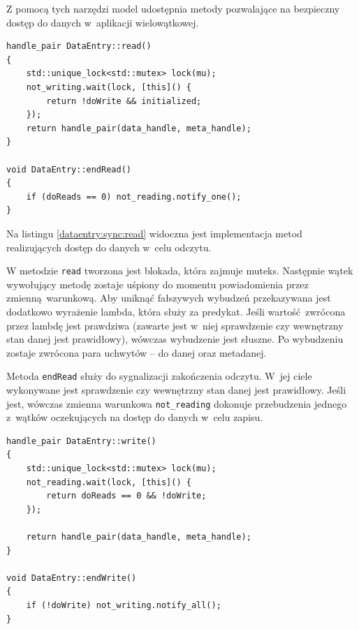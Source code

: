 Z pomocą tych narzędzi model udostępnia metody pozwalające na bezpieczny dostęp do danych w~aplikacji wielowątkowej.

\begin{minipage}{\textwidth}
	\begin{lstlisting}[label=dataentry:sync:read, caption={Metody klasy \lstinline$DataEntry$ zapewniające bezpieczny odczyt danych współdzielonych w~środowisku wielowątkowym},alsoletter={()[].=}]
handle_pair DataEntry::read()
{
	std::unique_lock<std::mutex> lock(mu);
	not_writing.wait(lock, [this]() {
		return !doWrite && initialized;
	});
	return handle_pair(data_handle, meta_handle);
}

void DataEntry::endRead()
{
	if (doReads == 0) not_reading.notify_one();
}
	\end{lstlisting}
\end{minipage}

Na listingu \ref{dataentry:sync:read} widoczna jest implementacja metod realizujących dostęp do danych w~celu odczytu. 

W metodzie \lstinline$read$ tworzona jest blokada, która zajmuje muteks. Następnie wątek wywołujący metodę zostaje uśpiony do momentu powiadomienia przez zmienną warunkową. Aby uniknąć fałszywych wybudzeń przekazywana jest dodatkowo wyrażenie lambda, która służy za predykat. Jeśli wartość zwrócona przez lambdę jest prawdziwa (zawarte jest w~niej sprawdzenie czy wewnętrzny stan danej jest prawidłowy), wówczas wybudzenie jest słuszne. Po wybudzeniu zostaje zwrócona para uchwytów -- do danej oraz metadanej.

Metoda \lstinline$endRead$ służy do sygnalizacji zakończenia odczytu. W~jej ciele wykonywane jest sprawdzenie czy wewnętrzny stan danej jest prawidłowy. Jeśli jest, wówczas zmienna warunkowa \lstinline$not_reading$ dokonuje przebudzenia jednego z~wątków oczekujących na dostęp do danych w~celu zapisu.

\begin{minipage}{\textwidth}
	\begin{lstlisting}[label=dataentry:sync:write, caption={Metody klasy \lstinline$DataEntry$ zapewniające bezpieczny zapis danych współdzielonych w~środowisku wielowątkowym},alsoletter={()[].=}]
handle_pair DataEntry::write()
{
	std::unique_lock<std::mutex> lock(mu);
	not_reading.wait(lock, [this]() {
		return doReads == 0 && !doWrite;
	});

	return handle_pair(data_handle, meta_handle);
}

void DataEntry::endWrite()
{
	if (!doWrite) not_writing.notify_all();
}
	\end{lstlisting}
\end{minipage}

